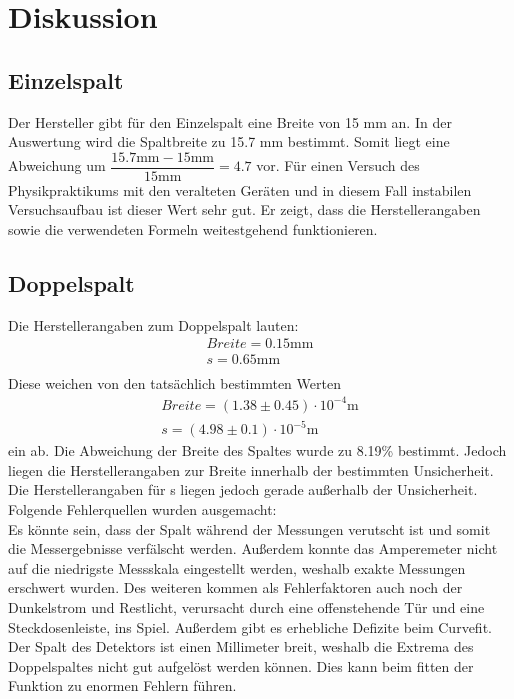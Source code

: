 \section{Diskussion}
\label{sec:Diskussion}

\subsection{Einzelspalt}
    Der Hersteller gibt für den Einzelspalt eine Breite von 15 mm an. In der Auswertung wird
    die Spaltbreite zu 15.7 mm bestimmt. Somit liegt eine Abweichung um $\dfrac{15.7 \si{\milli\metre} 
    - 15 \si{\milli\metre}}{15 \si{\milli\metre}} = 4.7 $ vor. Für einen Versuch des Physikpraktikums mit den veralteten Geräten 
    und in diesem Fall instabilen Versuchsaufbau ist dieser Wert sehr gut. Er zeigt, dass die 
    Herstellerangaben sowie die verwendeten Formeln weitestgehend funktionieren.
    
\subsection{Doppelspalt}
    Die Herstellerangaben zum Doppelspalt lauten:
    \begin{align*}
        Breite = 0.15 \si{\milli\metre}\\
        s = 0.65 \si{\milli\metre}\\
    \end{align*}
    Diese weichen von den tatsächlich bestimmten Werten 
    \begin{align*}
        Breite = (1.38 \pm 0.45)\cdot 10^{-4} \si{\metre}\\
        s = (4.98 \pm 0.1) \cdot 10^{-5} \si{\metre}
    \end{align*}
    ein ab. Die Abweichung der Breite des Spaltes wurde zu 8.19\% bestimmt. Jedoch liegen
    die Herstellerangaben zur Breite innerhalb der bestimmten Unsicherheit. Die
    Herstellerangaben für s liegen jedoch gerade außerhalb der Unsicherheit. Folgende 
    Fehlerquellen wurden ausgemacht:\\
    Es könnte sein, dass 
    der Spalt während der Messungen verutscht ist und somit die Messergebnisse verfälscht werden.
    Außerdem konnte das Amperemeter nicht auf die niedrigste Messskala eingestellt werden, weshalb
    exakte Messungen erschwert wurden. Des weiteren kommen als Fehlerfaktoren auch noch der 
    Dunkelstrom und Restlicht, verursacht durch eine offenstehende Tür und eine Steckdosenleiste, 
    ins Spiel.
    Außerdem gibt es erhebliche Defizite beim Curvefit. Der Spalt des Detektors ist einen Millimeter 
    breit, weshalb die Extrema des Doppelspaltes nicht gut aufgelöst werden können. Dies kann beim 
    fitten der Funktion zu enormen Fehlern führen.

